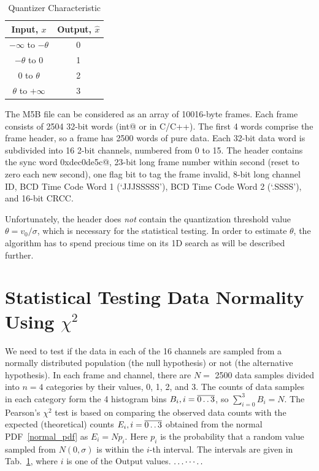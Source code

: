 \documentclass[letterpaper,twoside,12pt]{article}
\newcommand{\twodots}{\mathinner {\ldotp \ldotp}}
\begin{document}
\begin{table}[ht!]
  \begin{center}
    \caption{Quantizer Characteristic}
    \label{quant_io}
    \begin{tabular}{c|c}
      \textbf{Input, $x$} & \textbf{Output, $\hat{x}$} \\
      \hline
      $-\infty$ to $-\theta$ & 0 \\
      $-\theta$ to 0         & 1 \\
      0 to $\theta$          & 2 \\
      $\theta$ to $+\infty$  & 3 \\
    \end{tabular}
  \end{center}
\end{table}


The M5B file can be considered as an array of 10016-byte frames. Each frame consists of 2504 32-bit words (\verb@unsigned int@ or  \verb@uint@ in C/C++). The first 4 words comprise the frame header, so a frame has 2500 words of pure data. Each 32-bit data word is subdivided into 16 2-bit channels, numbered from 0 to 15. The header contains the sync word \verb@0xdec0de5c@, 23-bit long frame number within second (reset to zero each new second), one flag bit to tag the frame invalid, 8-bit long channel ID, BCD Time Code Word 1 (‘JJJSSSSS’), BCD Time Code Word 2 (‘.SSSS’), and  16-bit CRCC.

Unfortunately, the header does \emph{not} contain the quantization threshold value $\theta = v_0/\sigma$, which is necessary for the statistical testing. In order to estimate $\theta$, the algorithm has to spend precious time on its 1D search as will be described further. 




\section{Statistical Testing Data Normality Using $\chi^2$}

We need to test if the data in each of the 16 channels are sampled from a normally distributed population (the null hypothesis) or not (the alternative hypothesis). In each frame and channel, there are $N=$ 2500 data samples divided into $n=4$ categories by their values, 0, 1, 2, and 3. The counts of data samples in each category form the 4 histogram bins $B_i, i=\overline{0 \twodots 3}$, so $\sum_{i=0}^3 B_i = N$. The Pearson's $\chi^2$ test is based on comparing the observed data counts with the expected (theoretical) counts $E_i, i=\overline{0 \twodots 3}$ obtained from the normal PDF~\eqref{normal_pdf} as $E_i = Np_i$. Here $p_i$ is the probability that a random value sampled from $N(0,\sigma)$ is within the $i$-th interval. The intervals are given in Tab.~\ref{quant_io}, where $i$ is one of the Output values. $\ldots\cdots\ldotp\ldotp$
\end{document}
